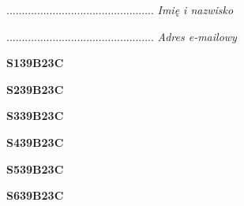\begin{turn}{90}\begin{minipage}{\linewidth} \vspace{20mm} ................................................  \textit{Imię i nazwisko}\end{minipage}\end{turn}

\begin{turn}{90}\begin{minipage}{\linewidth} \vspace{20mm} ................................................  \textit{Adres e-mailowy}\end{minipage}\end{turn}

\begin{turn}{90}\huge \begin{minipage}{\linewidth} \vspace{10mm}\textbf{S139B23C}\end{minipage}\end{turn}

\begin{turn}{90}\huge \begin{minipage}{\linewidth} \vspace{10mm}\textbf{S239B23C}\end{minipage}\end{turn}

\begin{turn}{90}\huge \begin{minipage}{\linewidth} \vspace{10mm}\textbf{S339B23C}\end{minipage}\end{turn}

\begin{turn}{90}\huge \begin{minipage}{\linewidth} \vspace{10mm}\textbf{S439B23C}\end{minipage}\end{turn}

\begin{turn}{90}\huge \begin{minipage}{\linewidth} \vspace{10mm}\textbf{S539B23C}\end{minipage}\end{turn}

\begin{turn}{90}\huge \begin{minipage}{\linewidth} \vspace{10mm}\textbf{S639B23C}\end{minipage}\end{turn}

